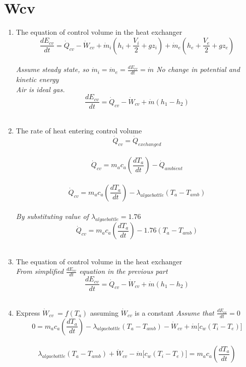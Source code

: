 \documentclass[10pt,a4paper]{ieeetran}
\begin{document}
	\section{Wcv}
	\begin{enumerate}
		\def\labelenumi{\roman{enumi}.}
		\item The equation of control volume in the heat exchanger
		$$\frac{dE_{cv}}{dt} = \dot{Q}_{cv} - \dot{W}_{cv} + \dot{m}_{i} \left( h_i + \frac{V_i}{2} + gz_i \right) + \dot{m}_{e} \left( h_e + \frac{V_e}{2} + gz_e \right)$$ \\
		\textit{Assume steady state, so $\dot{m}_{i} = \dot{m}_{e} = \frac{dE_{cv}}{dt} = \dot{m}$ No change in potential and kinetic energy} \\
		\textit{Air is ideal gas.} \\
		$$\frac{dE_{cv}}{dt} = \dot{Q}_{cv} - \dot{W}_{cv} + \dot{m} \left( h_1 - h_2 \right)$$ \\
		\item The rate of heat entering control volume \\
		$$\dot{Q}_{cv} = \dot{Q}_{exchanged}$$ \\
		$$\dot{Q}_{cv} = m_a c_a \left( \frac{dT_a}{dt} \right) - \dot{Q}_{ambient}$$ \\
		$$\dot{Q}_{cv} = m_a c_a \left( \frac{dT_a}{dt} \right) - \lambda_{algaebottle} \left( T_a - T_{amb} \right)$$ \\
		\textit{By substituting value of $\lambda_{algaebottle} = 1.76$} \\
		$$\dot{Q}_{cv} = m_a c_a \left( \frac{dT_a}{dt} \right) - 1.76 \left( T_a - T_{amb} \right)$$ \\
		\item The equation of control volume in the heat exchanger \\
		\textit{From simplified $\frac{dE_{cv}}{dt}$ equation in the previous part} \\
		$$\frac{dE_{cv}}{dt} = \dot{Q}_{cv} - \dot{W}_{cv} + \dot{m} \left( h_1 - h_2 \right)$$ \\
		\item Express $\dot{W}_{cv}\ = f \left( T_a \right)$ assuming $\dot{W}_{cv}$ is a constant
		\textit{Assume that $\frac{dE_{cv}}{dt} = 0$} \\
		$$0 = m_a c_a \left( \frac{dT_a}{dt} \right) - \lambda_{algaebottle} \left( T_a - T_{amb} \right) - \dot{W}_{cv} + \dot{m} \lbrack c_w \left( T_i - T_e \right) \rbrack$$ \\
		$$\lambda_{algaebottle} \left( T_a - T_{amb} \right) + \dot{W}_{cv} - \dot{m} \lbrack c_w \left( T_i - T_e \right) \rbrack = m_a c_a \left( \frac{dT_a}{dt} \right)$$ \\

\end{enumerate}
\end{document}
